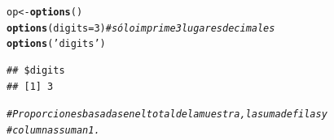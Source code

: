 \documentclass[12pt,letterpaper]{article}\usepackage[]{graphicx}\usepackage[]{color}
\makeatletter
\newcommand{\hlnum}[1]{\textcolor[rgb]{0.686,0.059,0.569}{#1}}%
\newcommand{\hlstr}[1]{\textcolor[rgb]{0.192,0.494,0.8}{#1}}%
\newcommand{\hlcom}[1]{\textcolor[rgb]{0.678,0.584,0.686}{\textit{#1}}}%
\newcommand{\hlstd}[1]{\textcolor[rgb]{0.345,0.345,0.345}{#1}}%
\newcommand{\hlkwb}[1]{\textcolor[rgb]{0.69,0.353,0.396}{#1}}%
\newcommand{\hlkwc}[1]{\textcolor[rgb]{0.333,0.667,0.333}{#1}}%
\newcommand{\hlkwd}[1]{\textcolor[rgb]{0.737,0.353,0.396}{\textbf{#1}}}%
\newenvironment{kframe}{%
 \def\at@end@of@kframe{}%
 \ifinner\ifhmode%
  \def\at@end@of@kframe{\end{minipage}}%
  \begin{minipage}{\columnwidth}%
 \fi\fi%
 \def\FrameCommand##1{\hskip\@totalleftmargin \hskip-\fboxsep
 \colorbox{shadecolor}{##1}\hskip-\fboxsep
     \hskip-\linewidth \hskip-\@totalleftmargin \hskip\columnwidth}%
 \MakeFramed {\advance\hsize-\width
   \@totalleftmargin\z@ \linewidth\hsize
   \@setminipage}}%
 {\par\unskip\endMakeFramed%
 \at@end@of@kframe}
\newenvironment{knitrout}{}{} %
\makeatother
\begin{document}
\begin{enumerate}
\begin{knitrout}
\begin{kframe}
\begin{alltt}
\hlstd{op} \hlkwb{<-} \hlkwd{options}\hlstd{()}
\hlkwd{options}\hlstd{(}\hlkwc{digits}\hlstd{=}\hlnum{3}\hlstd{)} \hlcom{# sólo imprime 3 lugares decimales }
\hlkwd{options}\hlstd{(}\hlstr{'digits'}\hlstd{)}
\end{alltt}
\begin{verbatim}
## $digits
## [1] 3
\end{verbatim}
\end{kframe}
\end{knitrout}

\begin{knitrout}
\color{fgcolor}\begin{kframe}
\begin{alltt}
\hlcom{# Proporciones basadas en el total de la muestra, la suma de filas y}
\hlcom{# columnas suman 1.}


\end{alltt}
\end{kframe}
\end{knitrout}
\end{enumerate}
\end{document}
